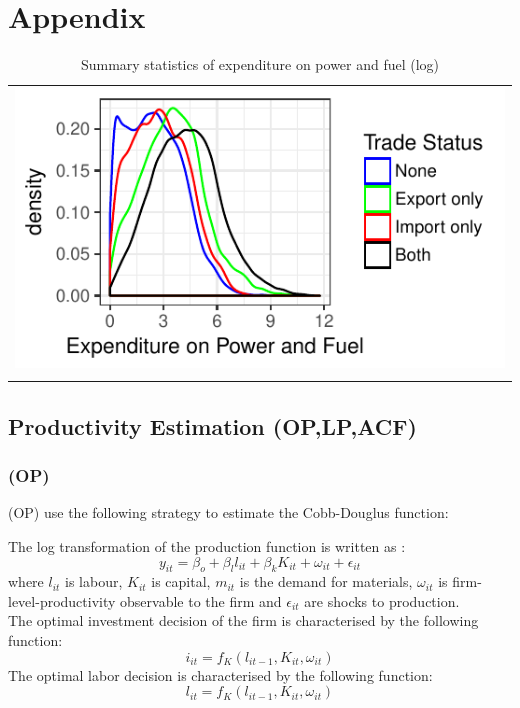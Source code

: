 \documentclass[11pt]{article}
\begin{document}
\section{Appendix}

\begin{center}
\begin{table}[tp]
\caption{Summary statistics of expenditure on power and fuel (log)}
\begin{tabular}{c}
 \includegraphics{./PICS/denslpower.pdf}   \\ 
   \\  
\end{tabular}
\end{table}
\end{center}

\subsection{Productivity Estimation (OP,LP,ACF)}\label{prodest}
\subsubsection{\cite{olley1992dynamics} (OP) }\label{op}

 \cite{olley1992dynamics} (OP) use the
following strategy to estimate the Cobb-Douglus function: 


The log transformation of the production function is written as : 
\begin{equation}
y_{it} = \beta_{o} + \beta_{l}l_{it} + \beta_{k}K_{it} + \omega_{it} + \epsilon_{it} 
\end{equation}
where $l_{it}$ is labour, $K_{it}$ is capital, $m_{it}$  is
the demand for materials, $\omega_{it}$ is firm-level-productivity
observable to the firm and $\epsilon_{it}$ are shocks to production.\\
The optimal investment decision of the firm is characterised by the following
function:
\begin{equation}
i_{it}= f_{K}(l_{it-1}, K_{it}, \omega_{it})
\end{equation}
The optimal labor decision is characterised by the following function:
\begin{equation}
l_{it}= f_{K}(l_{it-1}, K_{it}, \omega_{it})
\end{equation}
\end{document}
